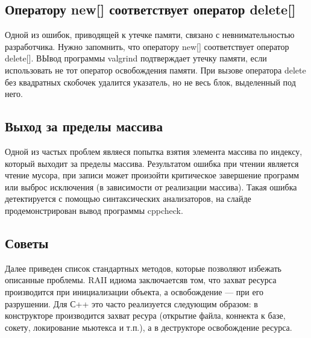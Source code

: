 \documentclass[10pt]{article}
\begin{document}
\subsection{Оператору new[] соответствует оператор delete[]}
Одной из ошибок, приводящей к утечке памяти, связано с невнимательностью разработчика.
Нужно запомнить, что оператору new[] соответствует оператор delete[]. ВЫвод программы valgrind подтверждает утечку памяти,
если использовать не тот оператор освобождения памяти. При вызове оператора delete без квадратных скобочек
удалится указатель, но не весь блок, выделенный под него.

\subsection{Выход за пределы массива}
Одной из частых проблем являеся попытка взятия элемента массива по индексу, который
выходит за пределы массива. Результатом ошибка при чтении является чтение мусора, при записи
может произойти критическое завершение программ или выброс исключения (в зависимости от реализации массива).
Такая ошибка детектируется с помощью синтаксических анализаторов, на слайде продемонстрирован вывод программы
cppcheck.


\subsection{Советы}
Далее приведен список стандартных методов, которые позволяют избежать 
описанные проблемы. RAII идиома заключаетсяв том, что захват ресурса производится при инициализации
объекта, а освобождение --- при его разрушении. Для С++ это часто реализуется следующим образом:
в конструкторе производится захват ресура (открытие файла, коннекта к базе, сокету, локирование мьютекса и т.п.),
а в деструкторе освобождение ресурса.
\end{document}
